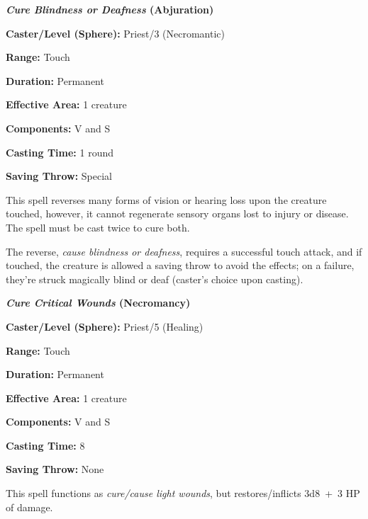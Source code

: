 \begin{multicols}{2}
 
\vspace{1em}

\noindent
\begin{minipage}{\columnwidth}

\noindent \textbf{\textit{Cure Blindness or Deafness} (Abjuration)}

\noindent \textbf{Caster/Level (Sphere):} Priest/3 (Necromantic)

\noindent \textbf{Range:} Touch

\noindent \textbf{Duration:} Permanent

\noindent \textbf{Effective Area:} 1 creature

\noindent \textbf{Components:} V and S

\noindent \textbf{Casting Time:} 1 round

\noindent \textbf{Saving Throw:} Special

\end{minipage}

This spell reverses many forms of vision or hearing loss upon the creature touched, however, it cannot regenerate sensory organs lost to injury or disease.  The spell must be cast twice to cure both.

The reverse, \textit{cause blindness or deafness}, requires a successful touch attack, and if touched, the creature is allowed a saving throw to avoid the effects; on a failure, they're struck magically blind or deaf (caster's choice upon casting).

\vspace{1em}

\noindent
\begin{minipage}{\columnwidth}

\noindent \textbf{\textit{Cure Critical Wounds} (Necromancy)}

\noindent \textbf{Caster/Level (Sphere):} Priest/5 (Healing)

\noindent \textbf{Range:} Touch

\noindent \textbf{Duration:} Permanent

\noindent \textbf{Effective Area:} 1 creature

\noindent \textbf{Components:} V and S

\noindent \textbf{Casting Time:} 8

\noindent \textbf{Saving Throw:} None

\end{minipage}

This spell functions as \textit{cure/cause light wounds}, but restores/inflicts 3d8~+~3 HP of damage.


\end{multicols}
